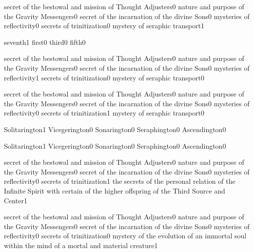 {secret of the bestowal and mission of Thought Adjusters}{0}
{nature and purpose of the Gravity Messengers}{0}
{secret of the incarnation of the divine Sons}{0}
{mysteries of reflectivity}{0}
{secrets of trinitization}{0}
{mystery of seraphic transport}{1}
\qstop

{seventh}{1}
{first}{0}
{third}{0}
{fifth}{0}
\qstop

{secret of the bestowal and mission of Thought Adjusters}{0}
{nature and purpose of the Gravity Messengers}{0}
{secret of the incarnation of the divine Sons}{0}
{mysteries of reflectivity}{1}
{secrets of trinitization}{0}
{mystery of seraphic transport}{0}
\qstop

{secret of the bestowal and mission of Thought Adjusters}{0}
{nature and purpose of the Gravity Messengers}{0}
{secret of the incarnation of the divine Sons}{0}
{mysteries of reflectivity}{0}
{secrets of trinitization}{1}
{mystery of seraphic transport}{0}
\qstop

{Solitarington}{1}
{Vicegerington}{0}
{Sonarington}{0}
{Seraphington}{0}
{Ascendington}{0}
\qstop

{Solitarington}{1}
{Vicegerington}{0}
{Sonarington}{0}
{Seraphington}{0}
{Ascendington}{0}
\qstop

{secret of the bestowal and mission of Thought Adjusters}{0}
{nature and purpose of the Gravity Messengers}{0}
{secret of the incarnation of the divine Sons}{0}
{mysteries of reflectivity}{0}
{secrets of trinitization}{1}
{the secrets of the personal relation of the Infinite Spirit with certain of the higher offspring of the Third Source and Center}{1}
\qstop

{secret of the bestowal and mission of Thought Adjusters}{0}
{nature and purpose of the Gravity Messengers}{0}
{secret of the incarnation of the divine Sons}{0}
{mysteries of reflectivity}{0}
{secrets of trinitization}{0}
{mystery of the evolution of an immortal soul within the mind of a mortal and material creature}{1}
\qstop

